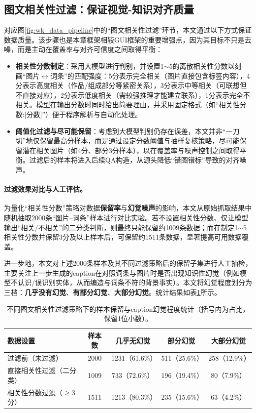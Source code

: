 \subsection{图文相关性过滤：保证视觉-知识对齐质量}
对应图\ref{fig:wk_data_pipeline}中的“图文相关性过滤”环节，本文通过以下方式保证数据质量。该步骤也是本章框架相较GUI框架的重要增强点，因为其目标不只是去噪，而是主动在覆盖率与对齐可信度之间取得平衡：
\begin{itemize}
  \item \textbf{相关性分数制定}：采用大模型进行判别，并设置1$\sim$5的离散相关性分数以刻画“图片$\leftrightarrow$词条”的匹配强度：5分表示完全相关（图片直接包含标签内容），4分表示高度相关（作品/组成部分等紧密关系），3分表示中等相关（可联想但不直接对应），2分表示低度相关（需较强推理才能建立联系），1分表示完全不相关。模型在输出分数时同时给出简要理由，并采用固定格式（如“相关性分数:[分数]”）便于程序解析与自动化处理。
  \item \textbf{阈值化过滤与尽可能保留}：考虑到大模型判别仍存在误差，本文并非“一刀切”地仅保留最高分样本，而是通过设定分数阈值与抽样复核策略，尽可能保留潜在相关图片（如4分、部分3分样本），以在覆盖率与噪声控制之间取得平衡。过滤后的样本将进入后续QA构造，从源头降低“错图错标”导致的对齐噪声。
\end{itemize}

\paragraph{过滤效果对比与人工评估。}
为量化“相关性分数”策略对数据\textbf{保留率}与\textbf{幻觉噪声}的影响，本文从原始抓取结果中随机抽取2000条“图片--词条”样本进行对比实验。若不设置相关性分数、仅让模型输出“相关/不相关”的二分类判断，则最终只能保留约1009条数据；而在制定1$\sim$5相关性分数并保留3分及以上样本后，可保留约1511条数据，显著提高可用数据覆盖。

进一步地，本文对上述2000条样本及其不同过滤策略后的保留子集进行人工抽检，主要关注上一步生成的caption在对照词条与图片时是否出现知识性幻觉（例如模型不认识/误识别实体，从而编造与词条不符的背景事实）。本文将幻觉程度划分为三档：\textbf{几乎没有幻觉}、\textbf{有部分幻觉}、\textbf{大部分幻觉}。统计结果如表\ref{tab:wk_rel_filter_hallu}所示。

\begin{table}[htbp]
\centering
\small
\renewcommand{\arraystretch}{1.2}
\begin{tabular}{lcccc}
\toprule
\textbf{数据设置} & \textbf{样本数} & \textbf{几乎无幻觉} & \textbf{部分幻觉} & \textbf{大部分幻觉} \\
\midrule
过滤前（未过滤） & 2000 & 1231（61.6\%） & 511（25.6\%） & 258（12.9\%） \\
直接相关性过滤（二分类） & 1009 & 733（72.6\%） & 196（19.4\%） & 80（7.9\%） \\
相关性分数过滤（$\ge$3分） & 1511 & 1213（80.3\%） & 235（15.6\%） & 63（4.2\%） \\
\bottomrule
\end{tabular}
\caption{不同图文相关性过滤策略下的样本保留与caption幻觉程度统计（括号内为占比，保留1位小数）。}
\label{tab:wk_rel_filter_hallu}
\end{table}

